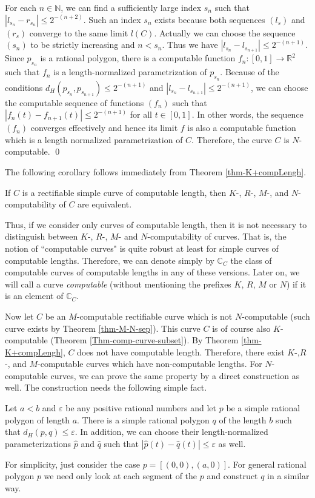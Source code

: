 \documentclass{LMCS}
\theoremstyle{plain}
\def\IC{\mathbb{C}}
\def\IN{\mathbb{N}}
\def\IR{\mathbb{R}}
\begin{document}
For each $n\in\IN$, we can find a sufficiently large index $s_n$ such that  $|l_{s_n} -r_{s_n}| \le 2^{-(n+2)}$. Such an index $s_n$ exists because both sequences $(l_s)$ and $(r_s)$ converge to the same limit $l(C)$. Actually we can choose the sequence $(s_n)$ to be strictly increasing and $n < s_n$. Thus we have $|l_{{s_n}}- l_{s_{n+1}}| \le 2^{-(n+1)}$.  Since $p_{s_n}$ is a rational polygon, there is a computable function $f_n:[0,1]\to \IR^2$ such that $f_n$ is a length-normalized parametrization of $p_{s_n}$. Because of the conditions $d_H(p_{s_n}, p_{s_{n+1}}) \le 2^{-(n+1)}$ and $|l_{s_n} -l_{s_{n+1}}| \le 2^{-(n+1)}$, we can choose the computable sequence of functions $(f_n)$ such that $|f_n(t) -f_{n+1}(t)| \le 2^{-(n+1)}$ for all $t \in [0,1]$. In other words, the sequence $(f_n)$ converges effectively and hence its limit $f$ is also a computable function which is a length normalized parametrization of $C$. Therefore, the curve $C$ is  $N$-computable.
\qed

The following corollary follows immediately from Theorem \ref{thm-K+compLengh}.

\begin{cor}\label{cor-equi-compLength}
If $C$ is a rectifiable simple curve of computable length, then $K$-, $R$-, $M$-, and $N$-computability of $C$ are equivalent.
\end{cor}

Thus, if we consider only curves of computable length, then it is not necessary to distinguish between $K$-, $R$-, $M$- and $N$-computability of curves. That is, the notion of ``computable curves" is quite robust at least for simple curves of computable lengths.
Therefore, we can denote simply by $\IC_C$ the class of computable curves of computable lengths in any of these versions. Later on, we will call a curve {\em computable} (without mentioning the prefixes $K$, $R$, $M$ or $N$) if it is an element of $\IC_C$.

Now let $C$ be an $M$-computable rectifiable curve which is not $N$-computable (such curve exists by Theorem \ref{thm-M-N-sep}). This curve $C$ is of course also $K$-computable (Theorem \ref{Thm-comp-curve-subset}). By Theorem \ref{thm-K+compLengh}, $C$ does not have computable length. Therefore, there exist $K$-,$R$-, and $M$-computable curves which have non-computable lengths.  For $N$-computable curves, we can prove the same property by a direct construction as well. The construction needs the following simple fact.

\begin{prop}\label{prop-polygon-a<b}
Let $a< b$ and $\varepsilon$ be any positive rational numbers and let $p$ be a simple rational polygon of length $a$. There is a simple rational polygon $q$ of the length $b$ such that $d_H(p,q) \le \varepsilon$. In addition, we can choose their length-normalized parameterizations $\hat{p}$ and $\hat{q}$ such that $|\hat{p}(t) -\hat{q}(t)| \le \varepsilon$ as well.
\end{prop}
\proof
For simplicity, just consider the case $p =[(0,0), (a,0)]$. For general rational polygon $p$ we need only look at each segment of the $p$ and construct $q$ in a similar way.
\end{document}
